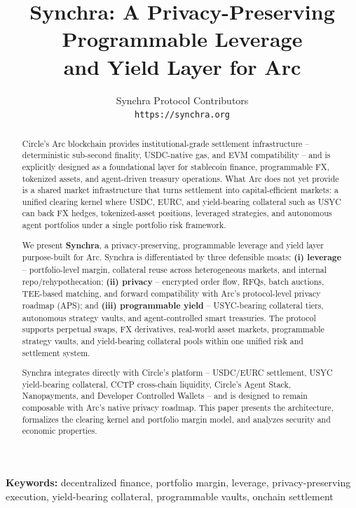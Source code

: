 \documentclass[11pt,a4paper]{article}
\title{
  \vspace{-1.5cm}
  \textbf{Synchra: A Privacy-Preserving Programmable Leverage\\[4pt]
  and Yield Layer for Arc}
  \vspace{-0.3cm}
}
\author{
  Synchra Protocol Contributors\\[4pt]
  \texttt{https://synchra.org}
}
\date{}
\begin{document}
\maketitle
\thispagestyle{empty}

\vspace{0.3cm}

\begin{abstract}
  \noindent Circle's Arc blockchain provides institutional-grade settlement infrastructure -- deterministic sub-second finality, USDC-native gas, and EVM compatibility -- and is explicitly designed as a foundational layer for stablecoin finance, programmable FX, tokenized assets, and agent-driven treasury operations. What Arc does not yet provide is a shared market infrastructure that turns settlement into capital-efficient markets: a unified clearing kernel where USDC, EURC, and yield-bearing collateral such as USYC can back FX hedges, tokenized-asset positions, leveraged strategies, and autonomous agent portfolios under a single portfolio risk framework.

  We present \textbf{Synchra}, a privacy-preserving, programmable leverage and yield layer purpose-built for Arc. Synchra is differentiated by three defensible moats: \textbf{(i) leverage} -- portfolio-level margin, collateral reuse across heterogeneous markets, and internal repo/rehypothecation; \textbf{(ii) privacy} -- encrypted order flow, RFQs, batch auctions, TEE-based matching, and forward compatibility with Arc's protocol-level privacy roadmap (APS); and \textbf{(iii) programmable yield} -- USYC-bearing collateral tiers, autonomous strategy vaults, and agent-controlled smart treasuries. The protocol supports perpetual swaps, FX derivatives, real-world asset markets, programmable strategy vaults, and yield-bearing collateral pools within one unified risk and settlement system.

  Synchra integrates directly with Circle's platform -- USDC/EURC settlement, USYC yield-bearing collateral, CCTP cross-chain liquidity, Circle's Agent Stack, Nanopayments, and Developer Controlled Wallets -- and is designed to remain composable with Arc's native privacy roadmap. This paper presents the architecture, formalizes the clearing kernel and portfolio margin model, and analyzes security and economic properties.
\end{abstract}

\vspace{0.3cm}

\noindent\textbf{Keywords:} decentralized finance, portfolio margin, leverage, privacy-preserving execution, yield-bearing collateral, programmable vaults, onchain settlement
\end{document}
